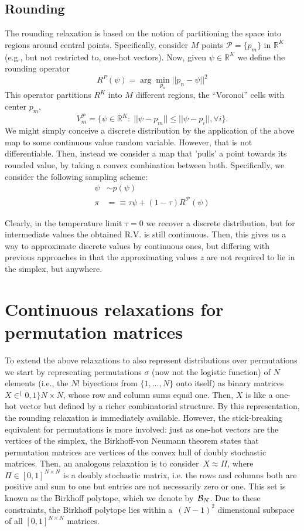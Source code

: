 \documentclass{article}
\begin{document}
\subsection{Rounding}
The rounding relaxation is based on the notion of partitioning the space into regions around central points. Specifically,  consider $M$ points $\mathcal{P}=\{p_m\}$ in $\mathbb{R}^K$ (e.g., but not restricted to, one-hot vectors). Now, given $\psi\in\mathbb{R}^K$ we define the rounding operator $$R^{P}(\psi)=\arg\min_{p_n} ||p_n-\psi||^2$$
This operator partitions $R^K$ into $M$ different regions, the ``Voronoi'' cells with center $p_m$, 
\begin{equation}V^\mathcal{P}_{m}=\{\psi\in\mathbb{R}^K:\;||\psi-p_m||\leq ||\psi-p_i||,\forall i\}.\end{equation}
We might simply conceive a discrete distribution by the application of the above map to some continuous value random variable. However, that is not differentiable. Then, instead we consider a map that 'pulls' a point towards its rounded value, by taking a convex combination between both. Specifically, we consider the following sampling scheme:
\begin{align}
  \psi &\sim p(\psi) \\
  \pi &  = \equiv \tau \psi + (1-\tau) R^\mathcal{P}(\psi) 
\end{align}

Clearly, in the temperature limit $\tau=0$ we recover a discrete distribution, but for intermediate values the obtained R.V. is still continuous. Then, this gives us a way to approximate discrete values by continuous ones, but differing with previous approaches in that the approximating values $z$ are not required to lie in the simplex, but anywhere.
 
 
\section{Continuous relaxations for permutation matrices}
\label{sec:permutation}
To extend the above relaxations to also represent distributions over permutations we start by representing permutations $\sigma$ (now not the logistic function) of $N$ elements (i.e., the $N!$ biyections from $\{1,\ldots,N\}$ onto itself) as binary matrices $X\in ^\{0,1\} {N \times N}$, whose row and column sums equal one. Then, $X$ is like a one-hot vector but defined by a richer combinatorial structure. By this representation, the rounding relaxation is immediately available. However, the stick-breaking equivalent for permutations is more involved: just as one-hot vectors are the vertices of the simplex, the Birkhoff-von Neumann
theorem states that permutation matrices are vertices of the convex
hull of doubly stochastic matrices. Then, an analogous relaxation is to consider~$X \approx {\Pi}$,
where ~${\Pi} \in [0,1]^{N \times N}$ is a doubly stochastic matrix,
i.e. the rows and columns both are positive and sum to one but entries are not necessarily zero or one. This set is known as the Birkhoff polytope, which we denote by~$\mathcal{B}_N$. Due to these constraints, the Birkhoff polytope lies within a~$(N-1)^2$ dimensional subspace of all $[0,1]^{N \times N}$ matrices.
 
\end{document}
